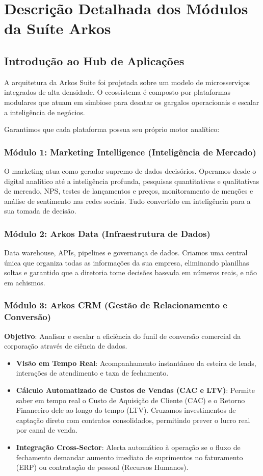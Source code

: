 \chapter{Descrição Detalhada dos Módulos da Suíte Arkos}

\section{Introdução ao Hub de Aplicações}
A arquitetura da Arkos Suite foi projetada sobre um modelo de microsserviços integrados de alta densidade. O ecossistema é composto por plataformas modulares que atuam em simbiose para desatar os gargalos operacionais e escalar a inteligência de negócios.

Garantimos que cada plataforma possua seu próprio motor analítico:

\subsection{Módulo 1: Marketing Intelligence (Inteligência de Mercado)}
O marketing atua como gerador supremo de dados decisórios. Operamos desde o digital analítico até a inteligência profunda, pesquisas quantitativas e qualitativas de mercado, NPS, testes de lançamentos e preços, monitoramento de menções e análise de sentimento nas redes sociais. Tudo convertido em inteligência para a sua tomada de decisão.

\subsection{Módulo 2: Arkos Data (Infraestrutura de Dados)}
Data warehouse, APIs, pipelines e governança de dados. Criamos uma central única que organiza todas as informações da sua empresa, eliminando planilhas soltas e garantido que a diretoria tome decisões baseada em números reais, e não em achismos.

\subsection{Módulo 3: Arkos CRM (Gestão de Relacionamento e Conversão)}
\textbf{Objetivo}: Analisar e escalar a eficiência do funil de conversão comercial da corporação através de ciência de dados.
\begin{itemize}
    \item \textbf{Visão em Tempo Real}: Acompanhamento instantâneo da esteira de leads, interações de atendimento e taxa de fechamento.
    \item \textbf{Cálculo Automatizado de Custos de Vendas (CAC e LTV)}: Permite saber em tempo real o Custo de Aquisição de Cliente (CAC) e o Retorno Financeiro dele ao longo do tempo (LTV). Cruzamos investimentos de captação direto com contratos consolidados, permitindo prever o lucro real por canal de venda.
    \item \textbf{Integração Cross-Sector}: Alerta automático à operação se o fluxo de fechamento demandar aumento imediato de suprimentos no faturamento (ERP) ou contratação de pessoal (Recursos Humanos).
\end{itemize}

